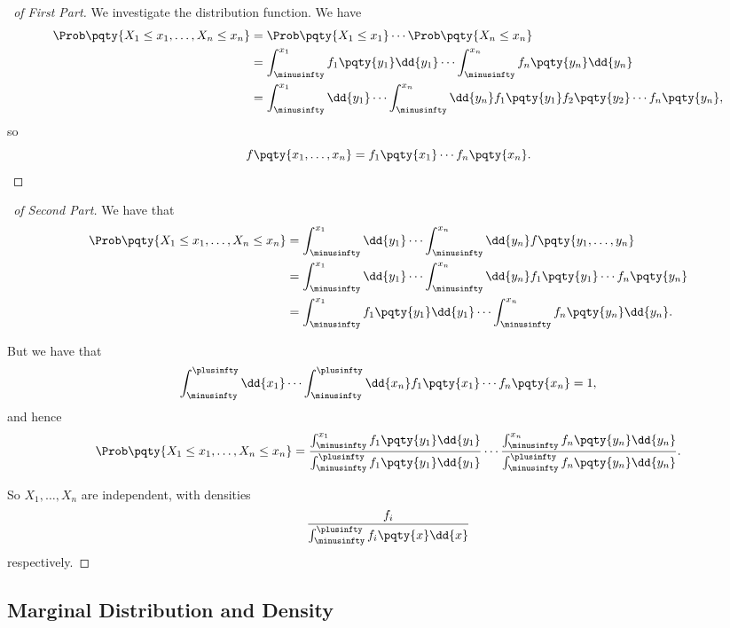 \begin{proof}[\proofname\ of First Part]
    We investigate the distribution function. We have
    \begin{align*}
        \Prob\pqty{X_1 \leq x_1, \ldots, X_n \leq x_n} &= \Prob\pqty{X_1 \leq x_1} \cdots \Prob\pqty{X_n \leq x_n} \\
        &= \int_{\minusinfty}^{x_1} f_1 \pqty{y_1} \dd{y_1} \cdots \int_{\minusinfty}^{x_n} f_n \pqty{y_n} \dd{y_n} \\
        &= \int_{\minusinfty}^{x_1} \dd{y_1} \cdots \int_{\minusinfty}^{x_n} \dd{y_n} f_1\pqty{y_1} f_2\pqty{y_2} \cdots f_n\pqty{y_n},
    \end{align*}
    so
    \[
        f\pqty{x_1, \ldots, x_n} = f_1\pqty{x_1} \cdots f_n\pqty{x_n}.
    \]
\end{proof}

\begin{proof}[\proofname\ of Second Part]
    We have that
    \begin{align*}
        \Prob\pqty{X_1 \leq x_1, \ldots, X_n \leq x_n} &= \int_{\minusinfty}^{x_1} \dd{y_1} \cdots \int_{\minusinfty}^{x_n} \dd{y_n} f\pqty{y_1, \ldots, y_n} \\
        &= \int_{\minusinfty}^{x_1} \dd{y_1} \cdots \int_{\minusinfty}^{x_n} \dd{y_n} f_1\pqty{y_1} \cdots f_n\pqty{y_n} \\
        &= \int_{\minusinfty}^{x_1} f_1\pqty{y_1} \dd{y_1} \cdots \int_{\minusinfty}^{x_n} f_n\pqty{y_n} \dd{y_n}.
    \end{align*}

    But we have that
    \[
        \int_{\minusinfty}^{\plusinfty} \dd{x_1} \cdots \int_{\minusinfty}^{\plusinfty} \dd{x_n} f_1\pqty{x_1} \cdots f_n\pqty{x_n} = 1,
    \]
    and hence
    \[
        \Prob\pqty{X_1 \leq x_1, \ldots, X_n \leq x_n} = \frac{\int_{\minusinfty}^{x_1} f_1\pqty{y_1} \dd{y_1}}{\int_{\minusinfty}^{\plusinfty} f_1\pqty{y_1} \dd{y_1}} \cdots \frac{\int_{\minusinfty}^{x_n} f_n\pqty{y_n} \dd{y_n}}{\int_{\minusinfty}^{\plusinfty} f_n\pqty{y_n} \dd{y_n}}.
    \]

    So \(X_1, \ldots, X_n\) are independent, with densities
    \[
        \frac{f_i}{\int_{\minusinfty}^{\plusinfty} f_i\pqty{x} \dd{x}}
    \]
    respectively.
\end{proof}

\subsection{Marginal Distribution and Density}

